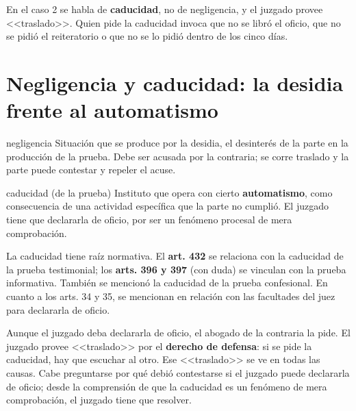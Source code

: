 \documentclass[12pt,oneside]{book}
\begin{document}

En el caso 2 se habla de \textbf{caducidad}, no de negligencia, y el juzgado provee <<traslado>>. Quien pide la caducidad invoca que no se libró el oficio, que no se pidió el reiteratorio o que no se lo pidió dentro de los cinco días.

\section{Negligencia y caducidad: la desidia frente al automatismo}

\begin{definition}{negligencia}
Situación que se produce por la desidia, el desinterés de la parte en la producción de la prueba. Debe ser acusada por la contraria; se corre traslado y la parte puede contestar y repeler el acuse.
\end{definition}

\begin{definition}{caducidad (de la prueba)}
Instituto que opera con cierto \textbf{automatismo}, como consecuencia de una actividad específica que la parte no cumplió. El juzgado tiene que declararla de oficio, por ser un fenómeno procesal de mera comprobación.
\end{definition}

La caducidad tiene raíz normativa. El \textbf{art. 432} se relaciona con la caducidad de la prueba testimonial; los \textbf{arts. 396 y 397} (con duda) se vinculan con la prueba informativa. También se mencionó la caducidad de la prueba confesional. En cuanto a los arts. 34 y 35, se mencionan en relación con las facultades del juez para declararla de oficio.


Aunque el juzgado deba declararla de oficio, el abogado de la contraria la pide. El juzgado provee <<traslado>> por el \textbf{derecho de defensa}: si se pide la caducidad, hay que escuchar al otro. Ese <<traslado>> se ve en todas las causas. Cabe preguntarse por qué debió contestarse si el juzgado puede declararla de oficio; desde la comprensión de que la caducidad es un fenómeno de mera comprobación, el juzgado tiene que resolver.
\end{document}

